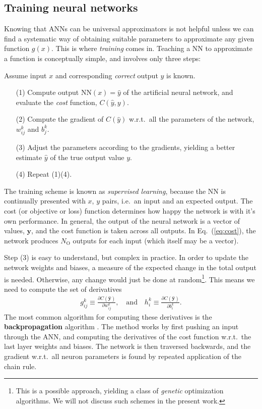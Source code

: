 \documentclass[a4paper, twocolumn]{article}
\newcommand{\eq} [1]{Eq.\ (\ref{eq:#1})}
\begin{document}
\subsection{Training neural networks}
Knowing that ANNs can be universal approximators is not helpful unless we can find a systematic way of obtaining suitable parameters to approximate any given function $g(x)$. This is where \emph{training} comes in. Teaching a NN to approximate a function is conceptually simple, and involves only three steps:
\begin{shadeframe}
Assume input $x$ and corresponding \emph{correct} output $y$ is known.
\begin{itemize}
  \item[(1)] Compute output $\text{NN}(x)=\hat y$ of the artificial neural network, and evaluate the \emph{cost} function, $C(\hat y,y)$. 
  \item[(2)] Compute the gradient of $C(\hat y)$ w.r.t.\ all the parameters of the network, $w_{ij}^k$ and $b^k_j$.  
  \item[(3)] Adjust the parameters according to the gradients, yielding a better estimate $\hat y$ of the true output value $y$. 
  \item[(4)] Repeat (1)\textemdash(4).
\end{itemize}
\end{shadeframe}
The training scheme is known as \emph{supervised learning}, because the NN is continually presented with $x$, $y$ pairs, i.e.\ an input and an expected output. The cost (or objective or loss) function determines how happy the network is with it's own performance. In general, the output of the neural network is a vector of values, $\mathbf{y}$, and the cost function is taken across all outputs. In \eq{cost}, the network produces $N_\text{O}$ outputs for each input (which itself may be a vector). 

Step (3) is easy to understand, but complex in practice. In order to update the network weights and biases, a measure of the expected change in the total output is needed. Otherwise, any change would just be done at random\footnote{This is a possible approach, yielding a class of \emph{genetic} optimization algorithms. We will not discuss such schemes in the present work.}. This means we need to compute the set of derivatives 
\begin{align}
g_{ij}^k \equiv \frac{\partial C(\hat{\mathbf{y}})}{\partial w_{ij}^k}, \ \ \ \text{ and } \ \ \ h_i^k\equiv \frac{\partial C(\hat{\mathbf{y}})}{\partial b^k_i}.
\end{align}
The most common algorithm for computing these derivatives is the {\bf backpropagation} algorithm \autocite{backprop}. The method works by first pushing an input through the ANN, and computing the derivatives of the cost function w.r.t.\ the last layer weights and biases. The network is then traversed backwards, and the gradient w.r.t.\ all neuron parameters is found by repeated application of the chain rule. 
\end{document}
